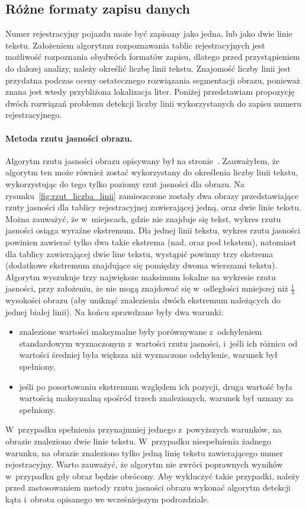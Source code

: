 \subsection{Różne formaty zapisu danych}\label{ssec:different_formats}
Numer rejestracyjny pojazdu może być zapisany jako jedna, lub jako dwie linie tekstu. Założeniem algorytmu rozpoznawania tablic rejestracyjnych jest możliwość rozpoznania obydwóch formatów zapisu, dlatego przed przystąpieniem do dalszej analizy, należy określić liczbę linii tekstu. Znajomość liczby linii jest przydatna podczas oceny ostatecznego rozwiązania segmentacji obrazu, ponieważ znana jest wtedy przybliżona lokalizacja liter. Poniżej przedstawiam propozycję dwóch rozwiązań problemu detekcji liczby linii wykorzystanych do zapisu numeru rejestracyjnego.
\paragraph{Metoda rzutu jasności obrazu.} Algorytm rzutu jasności obrazu opisywany był na stronie~\pageref{ssec:rzut_jasnosci}. Zauważyłem, że algorytm ten może również zostać wykorzystany do określenia liczby linii tekstu, wykorzystując do tego tylko poziomy rzut jasności dla obrazu. Na rysunku~\ref{fig:rzut_liczba_linii} zamieszczone zostały dwa obrazy przedstawiające rzuty jasności dla tablicy rejestracyjnej zawierającej jedną, oraz dwie linie tekstu. Można zauważyć, że w~miejscach, gdzie nie znajduje się tekst, wykres rzutu jasności osiąga wyraźne ekstremum. Dla jednej linii tekstu, wykres rzutu jasności powinien zawierać tylko dwa takie ekstrema (nad, oraz pod tekstem), natomiast dla tablicy zawierającej dwie line tekstu, wystąpić powinny trzy ekstrema (dodatkowe ekstremum znajdujące się pomiędzy dwoma wierszami tekstu).\\
Algorytm wyszukuje trzy największe maksimum lokalne na wykresie rzutu jasności, przy założeniu, że nie mogą znajdować się w~odległości mniejszej niż $\frac{1}{3}$ wysokości obrazu (aby uniknąć znalezienia dwóch ekstremum należących do jednej białej linii). Na końcu sprawdzane były dwa warunki:
\begin{itemize}
  \item znalezione wartości maksymalne były porównywane z~odchyleniem standardowym wyznaczonym z~wartości rzutu jasności, i~jeśli ich różnica od wartości średniej była większa niż wyznaczone odchylenie, warunek był spełniony,
  \item jeśli po posortowaniu ekstremum względem ich pozycji, druga wartość była wartością maksymalną spośród trzech znalezionych, warunek był uznany za spełniony.
\end{itemize}
 W~przypadku spełnienia przynajmniej jednego z~powyższych warunków, na obrazie znaleziono dwie linie tekstu. W~przypadku niespełnienia żadnego warunku, na obrazie znaleziono tylko jedną linię tekstu zawierającego numer rejestracyjny. Warto zauważyć, że algorytm nie zwróci poprawnych wyników w~przypadku gdy obraz będzie obrócony. Aby wykluczyć takie przypadki, należy przed zastosowaniem metody rzutu jasności obrazu wykonać algorytm detekcji kąta i~obrotu opisanego we wcześniejszym podrozdziale.


